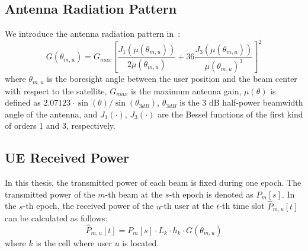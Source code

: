 \subsection{Antenna Radiation Pattern}
We introduce the antenna radiation pattern in~\cite{Energy-Efficient}:
\begin{equation}
    G(\theta_{m,u}) = G_{max} \left[ \frac{J_1\left(\mu(\theta_{m,u})\right)}{2\mu(\theta_{m,u})}
    + 36 \frac{J_3\left(\mu(\theta_{m,u})\right)}{\mu(\theta_{m,u})^3} \right]^2
\end{equation}
where $\theta_{m,u}$ is the boresight angle between the user position and the beam center with respect to the satellite, $G_{max}$ is the maximum antenna gain, $\mu(\theta)$ is defined as $2.07123 \cdot \sin(\theta)/\sin(\theta_{3dB})$, $\theta_{3dB}$ is the 3 dB half-power beamwidth angle of the antenna, and $J_1(\cdot)$, $J_3(\cdot)$ are the Bessel functions of the first kind of orders 1 and 3, respectively.

\subsection{UE Received Power}
In this thesis, the transmitted power of each beam is fixed during one epoch. The transmitted power of the $m$-th beam at the $s$-th epoch is denoted as $P_{m}[s]$. In the $s$-th epoch, the received power of the $u$-th user at the $t$-th time slot $\hat{P}_{m,u}[t]$ can be calculated as follows:
\begin{equation}
    \hat{P}_{m,u}[t] = P_{m}[s] \cdot L_{k} \cdot h_{k} \cdot G(\theta_{m,u}) \label{eq:T-R}
\end{equation}
where $k$ is the cell where user $u$ is located. 

